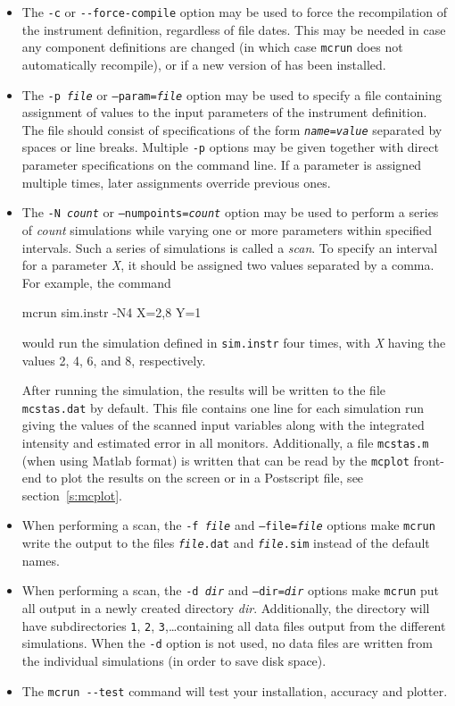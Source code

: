 \begin{itemize}
\item The \verb+-c+ or \verb+--force-compile+ option may be used to force the
  recompilation of the instrument definition, regardless of file dates. This may
  be needed in case any component definitions are changed (in which case
  \verb+mcrun+ does not automatically recompile), or if a new version of \MCS
  has been installed.
\item The \texttt{-p \textit{file}} or \texttt{--param=\textit{file}} option may be
  used to specify a file containing assignment of values to the input parameters
  of the instrument definition. The file should consist of specifications of the
  form \texttt{\textit{name\/}=\textit{value\/}} separated by spaces or line
  breaks. Multiple \verb+-p+ options may be given together with direct parameter
  specifications on the command line. If a parameter is assigned multiple times,
  later assignments override previous ones.
\item The \texttt{-N \textit{count}} or \texttt{--numpoints=\textit{count}} option
  may be used to perform a series of \textit{count\/} simulations while
  varying one or more parameters within specified intervals. Such a
  series of simulations is called a \emph{scan}. To specify
  an interval for a parameter \textit{X}, it should be assigned two
  values separated by a comma. For example, the command
\begin{bash}
mcrun sim.instr -N4 X=2,8 Y=1
\end{bash}
would run the simulation defined in \verb+sim.instr+ four times, with
\textit{X} having the values 2, 4, 6, and 8, respectively.

After running the simulation, the results will be written to the file
\verb+mcstas.dat+ by default. This file contains one line for each simulation
run giving the values of the scanned input variables along with the integrated
intensity and estimated error in all monitors. Additionally, a file
\verb+mcstas.m+ (when using Matlab format) is written that can be read by the
\verb+mcplot+ front-end to plot the results on the screen or in a Postscript
file, see section~\ref{s:mcplot}. 
\item When performing a scan, the \texttt{-f \textit{file}} and
  \texttt{--file=\textit{file}} options make \verb+mcrun+ write the output
  to the files \texttt{\textit{file\/}.dat} and \texttt{\textit{file\/}.sim}
  instead of the default names.
\item When performing a scan, the \texttt{-d \textit{dir}} and
  \texttt{--dir=\textit{dir}} options make \verb+mcrun+ put all output in a
  newly created directory \textit{dir}. Additionally, the directory will
  have subdirectories \verb+1+, \verb+2+, \verb+3+,\ldots containing all
  data files output from the different simulations. When the \verb+-d+
  option is not used, no data files are written from the individual
  simulations (in order to save disk space).
\item The \verb+mcrun --test+ command will test your \MCS installation,
  accuracy and plotter. 
\end{itemize}

